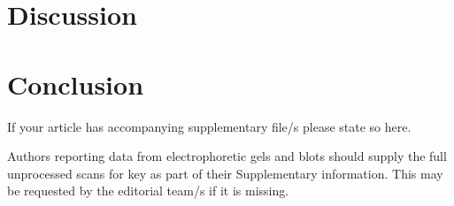 \documentclass[pdflatex,sn-mathphys-num]{sn-jnl}%
\theoremstyle{thmstyleone}%
\theoremstyle{thmstyletwo}%
\theoremstyle{thmstylethree}%
\begin{document}

\section{Discussion}
\label{dis}


\section{Conclusion}
\label{con}


\backmatter


If your article has accompanying supplementary file/s please state so here. 

Authors reporting data from electrophoretic gels and blots should supply the full unprocessed scans for key as part of their Supplementary information. This may be requested by the editorial team/s if it is missing.
\end{document}

